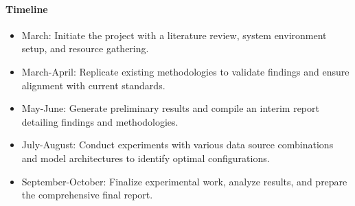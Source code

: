 \documentclass[12pt]{article}
\begin{document}
\paragraph{Timeline}
\begin{itemize}[noitemsep]
	\item March: Initiate the project with a literature review, system environment setup, and resource gathering.
	\item March-April: Replicate existing methodologies to validate findings and ensure alignment with current standards.
	\item May-June: Generate preliminary results and compile an interim report detailing findings and methodologies.
	\item July-August: Conduct experiments with various data source combinations and model architectures to identify optimal configurations.
	\item September-October: Finalize experimental work, analyze results, and prepare the comprehensive final report.
\end{itemize}


\end{document}
